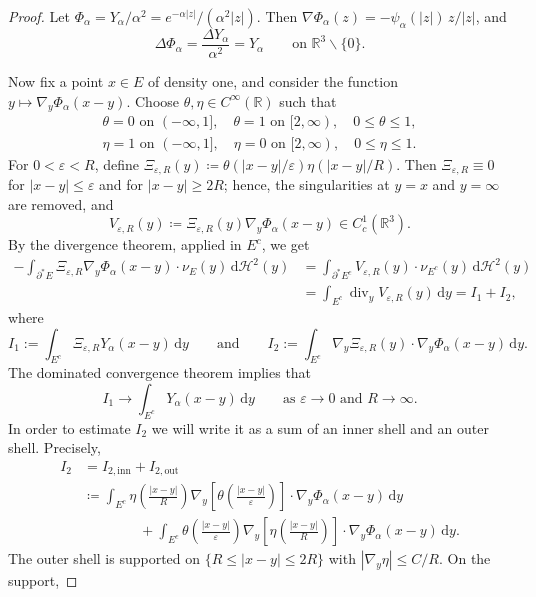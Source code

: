 \documentclass[a4paper,11pt,reqno]{amsart}
\numberwithin{equation}{section}
\theoremstyle{remark}
\theoremstyle{definition}
\newcommand{\e}{\varepsilon}
\newcommand{\R}{\mathbb R}
\newcommand{\dd}{\,\mathrm{d}}
\renewcommand{\setminus}{\backslash}
\newcommand{\defeq}{\coloneqq}
\newcommand{\pt}{\partial}
\newcommand{\Htwo}{\mathcal{H}^2}
\renewcommand{\leq}{\leqslant}
\renewcommand{\geq}{\geqslant}
\DeclareMathOperator{\dive}{div}
\begin{document}
\begin{proof}
Let $\Phi_\alpha=Y_\alpha/\alpha^2=e^{-\alpha|z|}/(\alpha^2|z|)$. Then $\nabla \Phi_\alpha(z)=-\psi_\alpha(|z|)\,z/|z|$, and
	\[
		\Delta \Phi_\alpha = \frac{\Delta Y_\alpha}{\alpha^2}=Y_\alpha \qquad \text{on } \R^3 \setminus \{0\}.
	\]
	
Now fix a point $x\in E$ of density one, and consider the function $y\mapsto \nabla_y \Phi_\alpha(x-y)$. Choose $\theta,\eta \in C^\infty(\R)$ such that
	\begin{gather*}
		\theta=0 \text{ on }(-\infty,1], \quad \theta=1 \text{ on } [2,\infty), \quad 0\leq \theta \leq 1,\\
		\eta=1 \text{ on }(-\infty,1], \quad \eta=0 \text{ on } [2,\infty), \quad 0\leq \eta \leq 1.
	\end{gather*}
For $0<\e<R$, define $\Xi_{\e,R}(y) \defeq \theta\left(|x-y|/\e\right)\eta\left(|x-y|/R\right)$. Then $\Xi_{\e,R}\equiv 0$ for $|x-y|\leq \e$ and for $|x-y|\geq 2R$; hence, the singularities at $y=x$ and $y=\infty$ are removed, and
	\[
		V_{\e,R}(y) \defeq \Xi_{\e,R}(y) \nabla_y \Phi_\alpha(x-y) \in C_c^1(\R^3).
	\]
By the divergence theorem, applied in $E^c$, we get
	\begin{align*}
		-\int_{\pt^* E} \Xi_{\e,R} \nabla_y\Phi_\alpha(x-y)\cdot \nu_E(y) \dd \Htwo(y) &= \int_{\pt^* E^c} V_{\e,R}(y) \cdot \nu_{E^c}(y) \dd \Htwo(y) \\
					&= \int_{E^c} \dive_y V_{\e,R}(y)\dd y =I_1+I_2,
	\end{align*}
where
	\[
		I_1:=\int_{E^c} \Xi_{\e,R} Y_\alpha(x-y)\dd y \qquad \text{and} \qquad I_2:= \int_{E^c} \nabla_y \Xi_{\e,R}(y) \cdot \nabla_y \Phi_\alpha(x-y)\dd y.
	\]
The dominated convergence theorem implies that
	\[
		I_1 \to \int_{E^c} Y_\alpha(x-y)\dd y \qquad \text{as }\e\to 0 \text{ and } R\to\infty.
	\]
In order to estimate $I_2$ we will write it as a sum of an inner shell and an outer shell. Precisely,
	\begin{align*}
		I_2 &= I_{2,\mathrm{inn}} + I_{2,\mathrm{out}} \\
			&\defeq \int_{E^c} \eta\left(\frac{|x-y|}{R}\right)\nabla_y\left[\theta\left(\frac{|x-y|}{\e}\right)\right] \cdot \nabla_y \Phi_\alpha(x-y)\dd y \\
			&\qquad\qquad + \int_{E^c} \theta\left(\frac{|x-y|}{\e}\right)\nabla_y\left[\eta\left(\frac{|x-y|}{R}\right)\right] \cdot \nabla_y \Phi_\alpha(x-y)\dd y.
	\end{align*}
The outer shell is supported on $\{R\leq |x-y|\leq 2R\}$ with $|\nabla_y \eta| \leq C/R$. On the support,

\end{proof}
\end{document}
